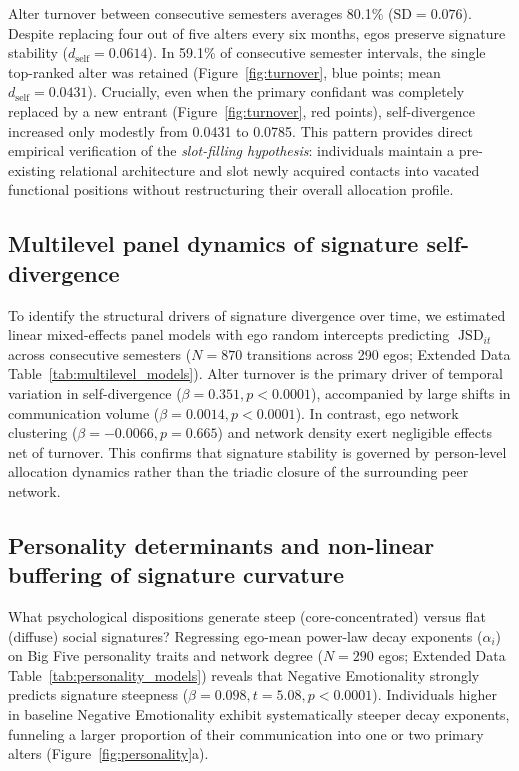 \documentclass[11pt,letterpaper]{article}
\newcommand{\JSD}{\operatorname{JSD}}
\newcommand{\dself}{d_{\mathrm{self}}}
\begin{document}
Alter turnover between consecutive semesters averages 80.1\% ($\text{SD} = 0.076$). Despite replacing four out of five alters every six months, egos preserve signature stability ($\dself = 0.0614$). In 59.1\% of consecutive semester intervals, the single top-ranked alter was retained (Figure~\ref{fig:turnover}, blue points; mean $\dself = 0.0431$). Crucially, even when the primary confidant was completely replaced by a new entrant (Figure~\ref{fig:turnover}, red points), self-divergence increased only modestly from 0.0431 to 0.0785. This pattern provides direct empirical verification of the \textit{slot-filling hypothesis}: individuals maintain a pre-existing relational architecture and slot newly acquired contacts into vacated functional positions without restructuring their overall allocation profile.

\subsection*{Multilevel panel dynamics of signature self-divergence}

To identify the structural drivers of signature divergence over time, we estimated linear mixed-effects panel models with ego random intercepts predicting $\JSD_{it}$ across consecutive semesters ($N = 870$ transitions across 290 egos; Extended Data Table~\ref{tab:multilevel_models}). Alter turnover is the primary driver of temporal variation in self-divergence ($\beta = 0.351, p < 0.0001$), accompanied by large shifts in communication volume ($\beta = 0.0014, p < 0.0001$). In contrast, ego network clustering ($\beta = -0.0066, p = 0.665$) and network density exert negligible effects net of turnover. This confirms that signature stability is governed by person-level allocation dynamics rather than the triadic closure of the surrounding peer network.

\subsection*{Personality determinants and non-linear buffering of signature curvature}

What psychological dispositions generate steep (core-concentrated) versus flat (diffuse) social signatures? Regressing ego-mean power-law decay exponents ($\alpha_i$) on Big Five personality traits and network degree ($N = 290$ egos; Extended Data Table~\ref{tab:personality_models}) reveals that Negative Emotionality strongly predicts signature steepness ($\beta = 0.098, t = 5.08, p < 0.0001$). Individuals higher in baseline Negative Emotionality exhibit systematically steeper decay exponents, funneling a larger proportion of their communication into one or two primary alters (Figure~\ref{fig:personality}a).
\end{document}

